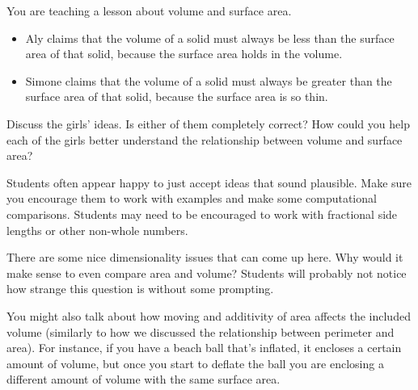 \documentclass{ximera}
\begin{document}
\newpage
\begin{problem}
You are teaching a lesson about volume and surface area.
    \begin{itemize}
        \item Aly claims that the volume of a solid must always be less than the surface area of that solid, because the surface area holds in the volume.
        \item Simone claims that the volume of a solid must always be greater than the surface area of that solid, because the surface area is so thin.
    \end{itemize}
    Discuss the girls' ideas.  Is either of them completely correct?  How could you help each of the girls better understand the relationship between volume and surface area?
    
    \begin{instructorNotes}
    Students often appear happy to just accept ideas that sound plausible.  Make sure you encourage them to work with examples and make some computational comparisons.  Students may need to be encouraged to work with fractional side lengths or other non-whole numbers.
    
    There are some nice dimensionality issues that can come up here.  Why would it make sense to even compare area and volume?  Students will probably not notice how strange this question is without some prompting.  
    
    You might also talk about how moving and additivity of area affects the included volume (similarly to how we discussed the relationship between perimeter and area).  For instance, if you have a beach ball that's inflated, it encloses a certain amount of volume, but once you start to deflate the ball you are enclosing a different amount of volume with the same surface area.
    \end{instructorNotes}
\end{problem}
\end{document}
